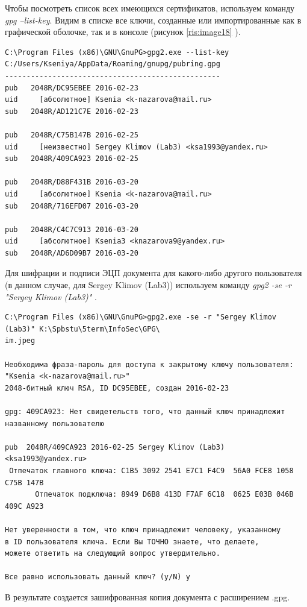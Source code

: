\documentclass[10pt,a4paper]{report}
\begin{document}
Чтобы посмотреть список всех имеющихся сертификатов, используем команду  \textit{gpg --list-key}. Видим в списке все ключи, созданные или импортированные как в графической оболочке, так и в консоле (рисунок \ref{ris:image18} ).
\begin{verbatim}
C:\Program Files (x86)\GNU\GnuPG>gpg2.exe --list-key
C:/Users/Kseniya/AppData/Roaming/gnupg/pubring.gpg
--------------------------------------------------
pub   2048R/DC95EBEE 2016-02-23
uid     [абсолютное] Ksenia <k-nazarova@mail.ru>
sub   2048R/AD121C7E 2016-02-23

pub   2048R/C75B147B 2016-02-25
uid     [неизвестно] Sergey Klimov (Lab3) <ksa1993@yandex.ru>
sub   2048R/409CA923 2016-02-25

pub   2048R/D88F431B 2016-03-20
uid     [абсолютное] Ksenia <k-nazarova@mail.ru>
sub   2048R/716EFD07 2016-03-20

pub   2048R/C4C7C913 2016-03-20
uid     [абсолютное] Ksenia3 <knazarova9@yandex.ru>
sub   2048R/AD6D09B7 2016-03-20 
\end{verbatim}

Для шифрации и подписи ЭЦП документа для какого-либо другого пользователя (в данном случае, для Sergey Klimov (Lab3)) используем команду \textit{gpg2 -se -r "Sergey Klimov (Lab3)" }.
\begin{verbatim} 
C:\Program Files (x86)\GNU\GnuPG>gpg2.exe -se -r "Sergey Klimov (Lab3)" K:\Spbstu\5term\InfoSec\GPG\
im.jpeg

Необходима фраза-пароль для доступа к закрытому ключу пользователя: "Ksenia <k-nazarova@mail.ru>"
2048-битный ключ RSA, ID DC95EBEE, создан 2016-02-23

gpg: 409CA923: Нет свидетельств того, что данный ключ принадлежит названному пользователю

pub  2048R/409CA923 2016-02-25 Sergey Klimov (Lab3) <ksa1993@yandex.ru>
 Отпечаток главного ключа: C1B5 3092 2541 E7C1 F4C9  56A0 FCE8 1058 C75B 147B
       Отпечаток подключа: 8949 D6B8 413D F7AF 6C18  0625 E03B 046B 409C A923

Нет уверенности в том, что ключ принадлежит человеку, указанному
в ID пользователя ключа. Если Вы ТОЧНО знаете, что делаете,
можете ответить на следующий вопрос утвердительно.

Все равно использовать данный ключ? (y/N) y
\end{verbatim}
В результате создается зашифрованная копия документа с расширением .gpg.
\end{document}
